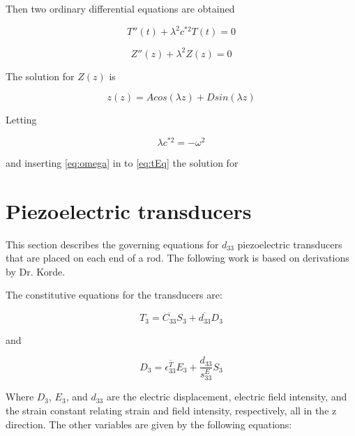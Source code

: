 Then two ordinary differential equations are obtained

\begin{equation}
T''(t) + \lambda^ 2 c^{*2}T(t) = 0
\label{eq:tEq}
\end{equation}

\begin{equation}
Z''(z) + \lambda ^2 Z(z) = 0
\end{equation}

The solution for $Z(z)$ is

\begin{equation}
z(z) = Acos(\lambda z) + Dsin(\lambda z)
\end{equation}

Letting 

\begin{equation}
\lambda c^{*2}  = -\omega ^2
\label{eq:omega}
\end{equation}

and inserting \ref{eq:omega} in to \ref{eq:tEq} the solution for 

\section{Piezoelectric transducers}

This section describes the governing equations for $d_{33}$ piezoelectric transducers that are placed on each end of a rod. The following work is based on derivations by Dr. Korde.

The constitutive equations for the transducers are:

\begin{equation}
T_3 = \overline{C_{33}} S_3 + \overline{d_{33}} D_3
\end{equation}

and 

\begin{equation}
D_3 = \overline{\epsilon ^T_{33}} E_3 + \frac{d_{33}}{s^E_{33}} S_3
\end{equation}


Where $D_3$, $E_3$, and $d_{33}$ are the electric displacement, electric field intensity, and the strain constant relating strain and field intensity, respectively, all in the z direction. The other variables are given by the following equations:

